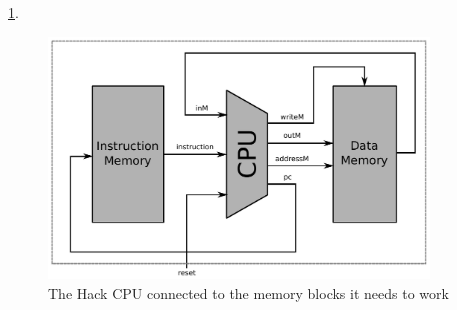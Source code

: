 \documentclass[a4paper]{article}
\begin{document}
            \ref{fig:cpu-memory}.
            \begin{figure}[h]
                \begin{center}
                    \includegraphics[width=0.9\textwidth]{imgs/cpu-memory.pdf}
                \end{center}
                \label{fig:cpu-memory}
                \caption{The Hack CPU connected to the memory blocks it needs to work}
            \end{figure}


    
    

\end{document}
